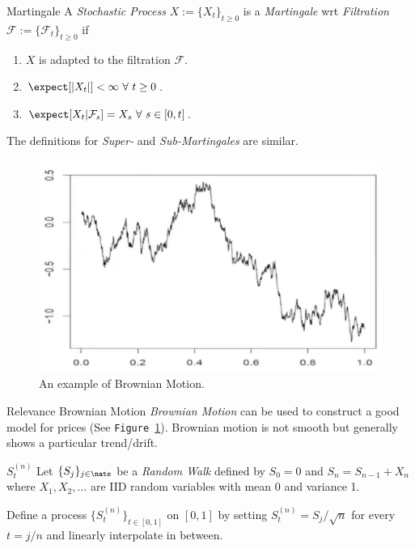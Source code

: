 \documentclass[11pt,a4paper]{article}
\begin{document}
  \begin{definition}{Martingale}
    A \textit{Stochastic Process} $X:=\{X_t\}_{t\geq0}$ is a \textit{Martingale} wrt \textit{Filtration} $\mathcal{F}:=\{\mathcal{F}_t\}_{t\geq0}$ if
    \begin{enumerate}
      \item $X$ is adapted to the filtration $\mathcal{F}$.
      \item $\expect[|X_t|]<\infty\ \forall\ t\geq0$.
      \item $\expect[X_t|\mathcal{F}_s]=X_s\ \forall\ s\in[0,t]$.
    \end{enumerate}
    The definitions for \textit{Super-} and \textit{Sub-Martingales} are similar.
  \end{definition}

  \begin{figure}[H]
    \centering\includegraphics[width=.7\textwidth]{BrownianMotionExample.PNG}
    \caption{An example of Brownian Motion.}
    \label{fig_brownian_motion_example}
  \end{figure}

  \begin{remark}{Relevance Brownian Motion}
    \textit{Brownian Motion} can be used to construct a good model for prices (See \texttt{Figure \ref{fig_brownian_motion_example}}). Brownian motion is not smooth but generally shows a particular trend/drift.
  \end{remark}

  \begin{definition}{$S_t^{(n)}$}\label{def_S_t_n}
    Let $\{S_j\}_{j\in\nats}$ be a \textit{Random Walk} defined by $S_0=0$ and $S_n=S_{n-1}+X_n$ where $X_1,X_2,\dots$ are IID random variables with mean 0 and variance 1.
    \par Define a process $\{S_t^{(n)}\}_{t\in[0,1]}$ on $[0,1]$ by setting $S_t^{(n)}=S_j/\sqrt{n}$ for every $t=j/n$ and linearly interpolate in between.
  \end{definition}
\end{document}
